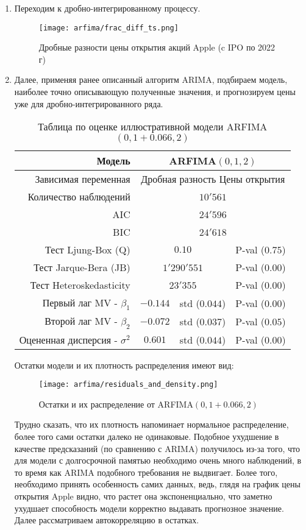 \begin{enumerate}
	\item Переходим к дробно-интегрированному процессу.
	\begin{figure}[H]
		\centering
		\texttt{[image: arfima/frac\_diff\_ts.png]}
		\caption{Дробные разности цены открытия акций Apple (c IPO по 2022 г)}
	\end{figure}

	\item Далее, применяя ранее описанный алгоритм ARIMA, подбираем модель, наиболее точно описывающую полученные значения, и прогнозируем цены уже для дробно-интегрированного ряда.
	\begin{table}[H]
		\centering
		\begin{tabular}{r|ccc}
			\toprule
			Модель & \multicolumn{3}{c}{ARFIMA$(0, 1, 2)$}\\
			\midrule[0.02cm]
			Зависимая переменная & \multicolumn{3}{c}{Дробная разность Цены открытия}\\
			Количество наблюдений & \multicolumn{3}{c}{$10'561$} \\
			AIC & \multicolumn{3}{c}{$24'596$} \\
			BIC & \multicolumn{3}{c}{$24'618$} \\
			\midrule[0.02cm]
			Тест Ljung-Box (Q) & \multicolumn{2}{c}{$0.10$} & P-val ($0.75$)\\
			Тест Jarque-Bera (JB) & \multicolumn{2}{c}{$1'290'551$} & P-val ($0.00$)\\
			Тест Heteroskedasticity & \multicolumn{2}{c}{$23'355$} & P-val ($0.00$)\\
			\midrule[0.02cm]
			Первый лаг MV - $\beta_1$ & $-0.144$ & std ($0.044$) & P-val ($0.00$)\\
			Второй лаг MV - $\beta_2$ & $-0.072$ & std ($0.037$) & P-val ($0.05$)\\
			Оцененная дисперсия - $\sigma^2$ & $0.601$ & std ($0.044$) & P-val ($0.00$)\\
			\midrule[0.02cm]
		\end{tabular}
		\caption{Таблица по оценке иллюстративной модели ARFIMA$(0,1 + 0.066,2)$}
	\end{table}
	\noindent Остатки модели и их плотность распределения имеют вид:
	\begin{figure}[H]
		\centering
		\texttt{[image: arfima/residuals\_and\_density.png]}
		\caption{Остатки и их распределение от ARFIMA$(0, 1 + 0.066, 2)$}
	\end{figure}
	\noindent Трудно сказать, что их плотность напоминает нормальное распределение, более того сами остатки далеко не одинаковые. Подобное ухудшение в качестве предсказаний (по сравнению с ARIMA) получилось из-за того, что для модели с долгосрочной памятью необходимо очень много наблюдений, в то время как ARIMA подобного требования не выдвигает. Более того, необходимо принять особенность самих данных, ведь, глядя на график цены открытия Apple видно, что растет она экспоненциально, что заметно ухудшает способность модели корректно выдавать прогнозное значение. Далее рассматриваем автокорреляцию в остатках.

\end{enumerate}
